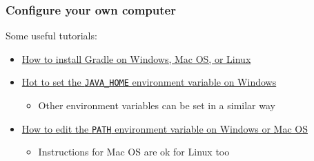 \documentclass[handout]{beamer}\mode<presentation>{\usetheme{AMSCesenaPurpleAndGold}}
\begin{document}
\begin{frame}
\frametitle{Configure your own computer}

	Some useful tutorials:
	\begin{itemize} 
		
		\item \href{https://docs.gradle.org/current/userguide/installation.html\#installing_manually}{How to install Gradle on Windows, Mac OS, or Linux}
		
		
		\item	 \href{https://confluence.atlassian.com/doc/setting-the-java_home-variable-in-windows-8895.html}{Hot to set the \texttt{JAVA\_HOME} environment variable on Windows}
		\begin{itemize}
			\item Other environment variables can be set in a similar way
		\end{itemize}
		
		\item \href{https://www.java.com/en/download/help/path.xml}{How to edit the \texttt{PATH} environment variable on Windows or Mac OS}
		\begin{itemize}
			\item Instructions for Mac OS are ok for Linux too
		\end{itemize}
	
	

\end{itemize}
\end{frame}
\end{document}
